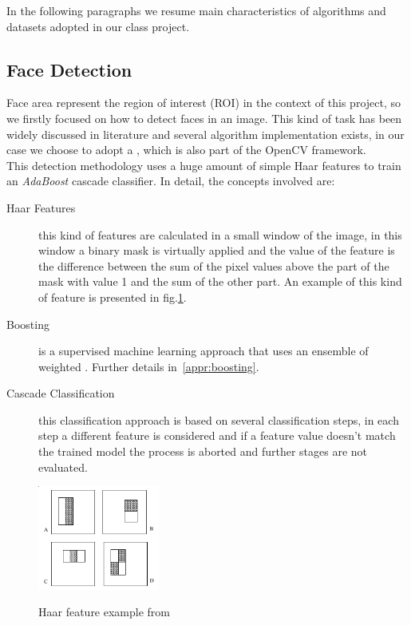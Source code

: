 In the following paragraphs we resume main characteristics of algorithms and datasets adopted in our class project.


\subsection{Face Detection}

Face area represent the region of interest (ROI) in the context of this project, so we firstly focused on how to detect faces in an image. This kind of task has been widely discussed in literature and several algorithm implementation exists, in our case we choose to adopt a \cite{Viola01rapidobject}, which is also part of the OpenCV framework.\\
This detection methodology uses a huge amount of simple Haar features to train an \emph{AdaBoost} cascade classifier. In detail, the concepts involved are:

\begin{description}
\item[Haar Features] this kind of features are calculated in a small window of the image, in this window a binary mask is virtually applied and the value of the feature is the difference between the sum of the pixel values above the part of the mask with value 1 and the sum of the other part. An example of this kind of feature is presented in fig.\ref{fig:haar}.
\item[Boosting] is a supervised machine learning approach that uses an ensemble of weighted . Further details in~\ref{appr:boosting}.
\item[Cascade Classification] this classification approach is based on several classification steps, in each step a different feature is considered and if a feature value doesn't match the trained model the process is aborted and further stages are not evaluated.
\end{description}

\begin{figure}[!h]
\centering
\includegraphics[width=4cm]{images/haarfeatures.png}
\label{fig:haar}
\caption{Haar feature example from \cite{Viola01rapidobject} }
\end{figure}

